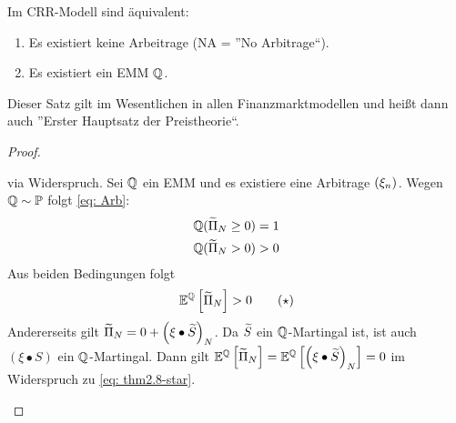 \begin{theorem}
	Im CRR-Modell sind äquivalent:
	\begin{enumerate}
		\item Es existiert keine Arbeitrage (NA = ''No Arbitrage``).
		\item Es existiert ein EMM $\mathbb{Q}$.
	\end{enumerate}
\end{theorem}

\begin{*bemerkung}
	Dieser Satz gilt im Wesentlichen in allen Finanzmarktmodellen und heißt dann auch ''Erster Hauptsatz der Preistheorie``.
\end{*bemerkung}

\begin{proof}
	\begin{equivalence}
		\rueckrichtung via Widerspruch. Sei $\mathbb{Q}$ ein EMM und es existiere eine Arbitrage $\left( \xi_n \right)_{}$. Wegen $\mathbb{Q} \sim \mathbb{P}$ folgt \eqref{eq: Arb}:
		\begin{equation*}
			\begin{aligned}
				\mathbb{Q}(\widetilde{\Pi}_N \ge 0) = 1 \\
				\mathbb{Q}(\widetilde{\Pi}_N > 0) > 0
			\end{aligned}
		\end{equation*}
		Aus beiden Bedingungen folgt 
		\begin{equation*}
			\mathbb{E}^{\mathbb{Q}}\left[ \widetilde{\Pi}_N \right] > 0
			\tag{$\star$} \label{eq: thm2.8-star}
		\end{equation*}
		Andererseits gilt $\widetilde{\Pi}_N = 0 + \left( \xi \bullet \widetilde{S} \right)_{N}$. Da $\widetilde{S}$ ein $\mathbb{Q}$-Martingal ist, ist auch $(\xi \bullet S)$ ein $\mathbb{Q}$-Martingal. Dann gilt $\mathbb{E}^{\mathbb{Q}} \left[ \widetilde{\Pi}_N \right] = \mathbb{E}^{\mathbb{Q}}\left[ \left( \xi \bullet \widetilde{S} \right)_{N} \right] = 0$ im Widerspruch zu \eqref{eq: thm2.8-star}.
	\end{equivalence}
\end{proof}
